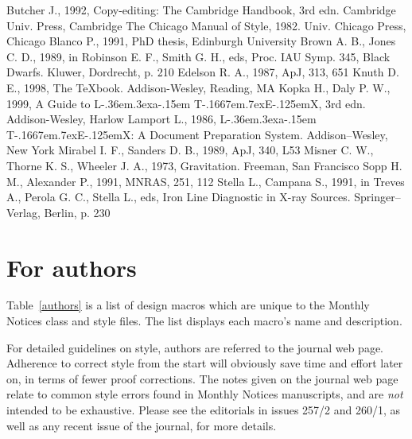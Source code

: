 \documentclass[useAMS,usenatbib]{mn2e}
\def\LaTeX{L\kern-.36em\raise.3ex\hbox{a}\kern-.15em
    T\kern-.1667em\lower.7ex\hbox{E}\kern-.125emX}
\begin{document}
\begin{thebibliography}{}
    Butcher J., 1992, Copy-editing: The Cambridge
    Handbook, 3rd edn. Cambridge Univ. Press,
    Cambridge
   The Chicago Manual of Style, 1982.
    Univ. Chicago Press, Chicago
    Blanco P., 1991, PhD thesis, Edinburgh
    University
   Brown A. B., Jones C. D., 1989,
    in Robinson E. F., Smith G. H., eds,
    Proc. IAU Symp. 345, Black Dwarfs.
    Kluwer, Dordrecht, p. 210
    Edelson R. A., 1987, ApJ, 313, 651
    Knuth D. E., 1998, The \TeX book. Addison-Wesley, Reading, MA
    Kopka H., Daly P. W., 1999, A Guide to \LaTeX, 3rd edn. Addison-Wesley,
    Harlow
    Lamport L., 1986, \LaTeX: A Document
    Preparation System. Addison--Wesley, New York
   Mirabel I. F., Sanders D. B., 1989,
    ApJ, 340, L53
   Misner C. W., Thorne K. S.,
    Wheeler J. A., 1973, Gravitation.
    Freeman, San Francisco
   Sopp H. M., Alexander P., 1991,
    MNRAS, 251, 112
   Stella L., Campana S., 1991, in
    Treves A., Perola G. C., Stella L., eds,
    Iron Line Diagnostic in X-ray Sources.
    Springer--Verlag, Berlin, p. 230
\end{thebibliography}


\appendix
\section{For authors}

Table~\ref{authors} is a list of design macros which are unique to
the Monthly Notices class and style files. The list displays each
macro's name and description.

For detailed guidelines on style, authors are referred to the
journal web page. Adherence to correct style from the start will
obviously save time and effort later on, in terms of fewer proof
corrections.  The notes given on the journal web page relate to
common style errors found in  Monthly Notices manuscripts, and are
{\it not\/} intended to be exhaustive. Please see the editorials
in issues 257/2 and 260/1, as well as any recent issue of the
journal, for more details.
\end{document}
